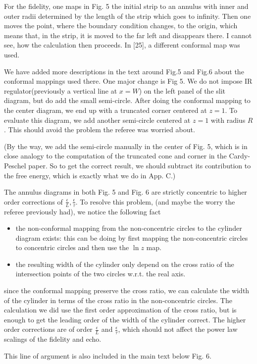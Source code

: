 \documentclass{article}
\newcommand{\reply}[1]{{\color{black}#1}}
\begin{document}
For the fidelity, one maps in Fig. 5 the initial strip to an annulus with inner and outer radii determined by the length of the strip which goes to infinity. Then one moves the point, where the boundary condition changes, to the origin, which means that, in the strip, it is moved to the far left and disappears there. I cannot see, how the calculation then proceeds. In [25], a different conformal map was used.

\reply{
We have added more descriptions in the text around Fig.5 and Fig.6 about the conformal mappings used there. One major change is Fig 5. We do not impose IR regulator(previously a vertical line at $x = W$)  on the left panel of the slit diagram, but do add the small semi-circle. After doing the conformal mapping to the center diagram, we end up with a truncated corner centered at $z = 1$. To evaluate this diagram, we add another semi-circle centered at $z = 1$ with radius $R$. This should avoid the problem the referee was worried about. 

(By the way, we add the semi-circle manually in the center of Fig. 5, which is in close analogy to the computation of the truncated cone and corner in the Cardy-Peschel paper. So to get the correct result, we should subtract its contribution to the free energy, which is exactly what we do in App. C.)

The annulus diagrams in both Fig. 5 and Fig. 6 are strictly concentric to higher order corrections of $\frac{\epsilon}{L}, \frac{\epsilon}{\tau}$. To resolve this problem, (and maybe the worry the referee previously had), we notice the following fact
\begin{itemize}
\item the non-conformal mapping from the non-concentric circles to the cylinder diagram exists: this can be doing by first mapping the non-concentric circles to concentric circles and then use the $\ln z$ map. 
\item the resulting width of the cylinder only depend on the cross ratio of the intersection points of the two circles w.r.t. the real axis. 
\end{itemize}
since the conformal mapping preserve the cross ratio, we can calculate the width of the cylinder in terms of the cross ratio in the non-concentric circles. The calculation we did use the first order approximation of the cross ratio, but is enough to get the leading order of the width of the cylinder correct. The higher order corrections are of order $\frac{\epsilon}{L}$ and $\frac{\epsilon}{\tau}$, which should not affect the power law scalings of the fidelity and echo. 

This line of argument is also included in the main text below Fig. 6. 
}
\end{document}
